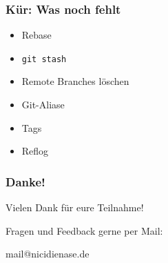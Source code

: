 \documentclass{beamer}
\begin{document}
\begin{frame}
 \frametitle{Kür: Was noch fehlt}
  


\begin{itemize}
  \item Rebase
  \item \texttt{git stash}
  \item Remote Branches löschen
  \item Git-Aliase
  \item Tags
  \item Reflog
\end{itemize}

  
 \end{frame}
\begin{frame}
 \frametitle{Danke!}
  


Vielen Dank für eure Teilnahme!


\vspace{0.5cm}


Fragen und Feedback gerne per Mail:


\vspace{.2cm}


\begin{center}
mail@nicidienase.de
\end{center}

  
 \end{frame}
\end{document}
